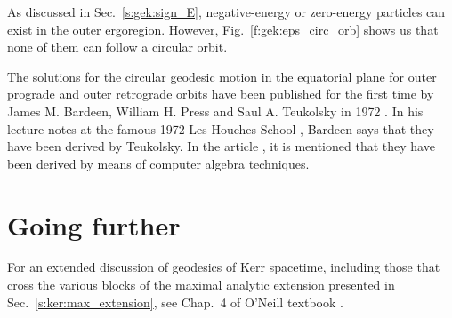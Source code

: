 \begin{remark}
As discussed in Sec.~\ref{s:gek:sign_E}, negative-energy or zero-energy particles can exist in
the outer ergoregion. However, Fig.~\ref{f:gek:eps_circ_orb} shows us that none
of them can follow a circular orbit.
\end{remark}



\begin{hist}
The solutions for the circular geodesic motion in the equatorial plane
for outer prograde and outer retrograde orbits have been published for the first
time by James M. Bardeen, William H. Press and Saul A. Teukolsky in 1972 \cite{BardePT72}. In his lecture notes at the famous
1972 Les Houches School \cite{Barde73}, Bardeen says that they have been derived by Teukolsky.
In the article \cite{BardePT72}, it is mentioned that they have been derived by means of
computer algebra techniques.
\end{hist}









\section{Going further}

For an extended discussion of geodesics of Kerr spacetime, including those
that cross the various blocks of the maximal analytic extension presented in
Sec.~\ref{s:ker:max_extension}, see Chap.~4 of O'Neill textbook \cite{ONeil95}.

